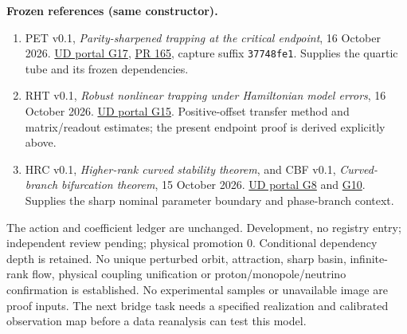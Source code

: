 \documentclass[11pt,a4paper]{article}
\begin{document}
\textbf{Frozen references (same constructor).}
\begin{enumerate}
\item PET v0.1, \emph{Parity-sharpened trapping at the critical endpoint}, 16 October 2026. \href{https://unified-dynamics-public.ben-w-mayes.chatgpt.site/papers/\#endpoint-parity-v01}{UD portal G17}, \href{https://github.com/ud-tetra/UD/pull/165}{PR 165}, capture suffix \texttt{37748fe1}. Supplies the quartic tube and its frozen dependencies.
\item RHT v0.1, \emph{Robust nonlinear trapping under Hamiltonian model errors}, 16 October 2026. \href{https://unified-dynamics-public.ben-w-mayes.chatgpt.site/papers/\#robust-trapping-v01}{UD portal G15}. Positive-offset transfer method and matrix/readout estimates; the present endpoint proof is derived explicitly above.
\item HRC v0.1, \emph{Higher-rank curved stability theorem}, and CBF v0.1, \emph{Curved-branch bifurcation theorem}, 15 October 2026. \href{https://unified-dynamics-public.ben-w-mayes.chatgpt.site/papers/\#higher-rank-curved-v01}{UD portal G8} and \href{https://unified-dynamics-public.ben-w-mayes.chatgpt.site/papers/\#critical-bifurcation-v01}{G10}. Supplies the sharp nominal parameter boundary and phase-branch context.
\end{enumerate}
The action and coefficient ledger are unchanged. Development, no registry entry; independent review pending; physical promotion $0$. Conditional dependency depth is retained. No unique perturbed orbit, attraction, sharp basin, infinite-rank flow, physical coupling unification or proton/monopole/neutrino confirmation is established. No experimental samples or unavailable image are proof inputs. The next bridge task needs a specified realization and calibrated observation map before a data reanalysis can test this model.
\end{document}

